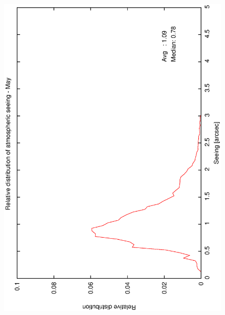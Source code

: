 {{\begin{figure}[htbp]
\begin{center}
{   \includegraphics[scale=0.25, angle=-90]{figures/ecs/corr_see_dist_may.eps}
  }
 \subfigure[] {
   \label{fig:see_dist_jun}
}
\end{center}
\end{figure}}}
